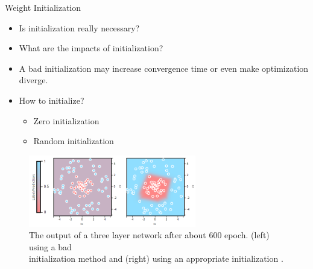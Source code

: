 \documentclass[compress,oilve,t]{beamer}
\begin{document}
\begin{frame}{Weight Initialization}
	\begin{itemize}
		\item Is initialization really necessary?
		\item What are the impacts of initialization?
		\item A bad initialization may increase convergence time or even make optimization diverge.
		\item How to initialize?
		\begin{itemize}
			\item Zero initialization
			\item Random initialization
		\end{itemize}
	\end{itemize}
	\begin{figure}[H]
		\centering
		\includegraphics[width=0.65\textwidth]{Figs/wi-crucial.png}
		\caption{The output of a three layer network after about 600 epoch. (left) using a bad\\ initialization method and (right) using an appropriate initialization \cite{katanforoosh-kunin}.}
	\end{figure}
\end{frame}
\end{document}

